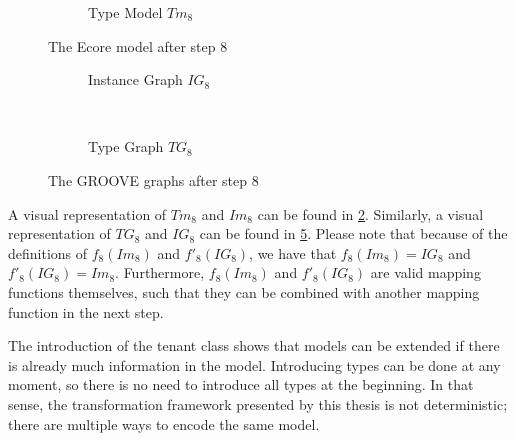 \begin{figure}[p]
\begin{subfigure}{0.98\textwidth}
        \caption{Type Model $Tm_8$}
        \label{fig:application:building_the_model:tenants:ecore:type_model}
    \end{subfigure}
    \caption{The Ecore model after step 8}
    \label{fig:application:building_the_model:tenants:ecore}
\end{figure}

\begin{figure}[p]
    \centering
    \begin{subfigure}{0.98\textwidth}
        \centering
        
        \caption{Instance Graph $IG_8$}
        \label{fig:application:building_the_model:tenants:groove:instance_graph}
    \end{subfigure}
    \\
    \begin{subfigure}{0.98\textwidth}
        \centering
        
        \caption{Type Graph $TG_8$}
        \label{fig:application:building_the_model:tenants:groove:type_graph}
    \end{subfigure}
    \caption{The GROOVE graphs after step 8}
    \label{fig:application:building_the_model:tenants:groove}
\end{figure}

A visual representation of $Tm_8$ and $Im_8$ can be found in \cref{fig:application:building_the_model:tenants:ecore}. Similarly, a visual representation of $TG_8$ and $IG_8$ can be found in \cref{fig:application:building_the_model:tenants:groove}. Please note that because of the definitions of $f_8(Im_8)$ and $f'_8(IG_8)$, we have that $f_8(Im_8) = IG_8$ and $f'_8(IG_8) = Im_8$. Furthermore, $f_8(Im_8)$ and $f'_8(IG_8)$ are valid mapping functions themselves, such that they can be combined with another mapping function in the next step.

The introduction of the tenant class shows that models can be extended if there is already much information in the model. Introducing types can be done at any moment, so there is no need to introduce all types at the beginning. In that sense, the transformation framework presented by this thesis is not deterministic; there are multiple ways to encode the same model.

\afterpage{\FloatBarrier}